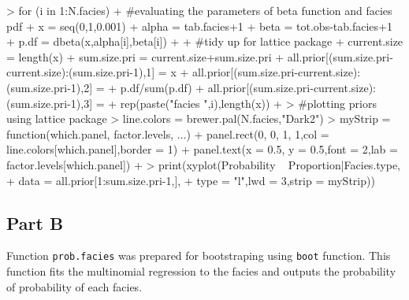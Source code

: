 \documentclass[paper=a4, fontsize=12pt]{scrartcl} %
\numberwithin{equation}{section} %
\numberwithin{figure}{section} %
\numberwithin{table}{section} %
\begin{document}
\begin{Schunk}
\begin{Sinput}
> for (i in 1:N.facies){
+   #evaluating the parameters of beta function and facies pdf
+   x     =  seq(0,1,0.001)
+   alpha = tab.facies+1
+   beta  =  tot.obs-tab.facies+1
+   p.df  = dbeta(x,alpha[i],beta[i])
+   
+   #tidy up for lattice package 
+   current.size = length(x)
+   sum.size.pri = current.size+sum.size.pri
+   all.prior[(sum.size.pri-current.size):(sum.size.pri-1),1] = x
+   all.prior[(sum.size.pri-current.size):(sum.size.pri-1),2] = 
+     p.df/sum(p.df)
+   all.prior[(sum.size.pri-current.size):(sum.size.pri-1),3] =
+    rep(paste("facies ",i),length(x))    
+ }
> #plotting priors using lattice package 
> line.colors = brewer.pal(N.facies,"Dark2")
> myStrip     = function(which.panel, factor.levels, ...) {
+   panel.rect(0, 0, 1, 1,col = line.colors[which.panel],border = 1)
+   panel.text(x = 0.5, y = 0.5,font = 2,lab = factor.levels[which.panel])
+ }
> print(xyplot(Probability ~ Proportion|Facies.type,
+                data = all.prior[1:sum.size.pri-1,],
+                type = "l",lwd = 3,strip = myStrip))
\end{Sinput}
\end{Schunk}


\subsection{Part B}
Function \texttt{prob.facies} was prepared for bootstraping using \texttt{boot} function. This function fits the multinomial regression to the facies and outputs the probability of probability of each facies. 
\begin{Schunk}
\end{Schunk}
\end{document}
